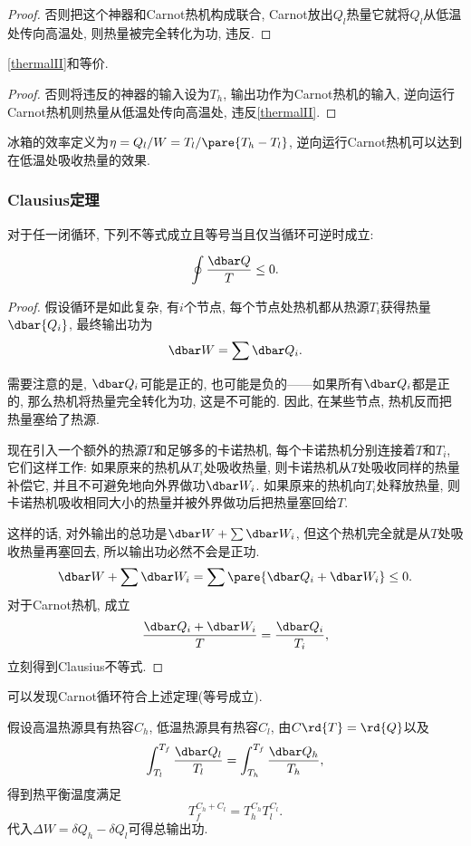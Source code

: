 \documentclass[../Thermal.tex]{subfiles}
\begin{document}
\begin{proof}
否则把这个神器和Carnot热机构成联合, Carnot放出$Q_l$热量它就将$Q_l$从低温处传向高温处, 则热量被完全转化为功, 违反.
\end{proof}
\begin{theorem}
\cref{thermalII}和等价.
\end{theorem}
\begin{proof}
否则将违反的神器的输入设为$T_h$, 输出功作为Carnot热机的输入, 逆向运行Carnot热机则热量从低温处传向高温处, 违反\cref{thermalII}.
\end{proof}
\begin{ex}[逆向运行的热机]
冰箱的效率定义为$\eta = Q_l/W = T_l/\pare{T_h - T_l}$, 逆向运行Carnot热机可以达到在低温处吸收热量的效果.
\end{ex}
\subsubsection{Clausius定理}
\begin{theorem}[Clausius定理]
对于任一闭循环, 下列不等式成立且等号当且仅当循环可逆时成立:
\begin{finale}
\[ \oint \frac{\dbar Q}{T} \le 0. \]
\end{finale}
\end{theorem}
\begin{proof}
假设循环是如此复杂, 有$i$个节点, 每个节点处热机都从热源$T_i$获得热量$\dbar{Q_i}$, 最终输出功为
\[ \dbar W = \sum \dbar Q_i. \]
\par
需要注意的是, $\dbar Q_i$可能是正的, 也可能是负的——如果所有$\dbar Q_i$都是正的, 那么热机将热量完全转化为功, 这是不可能的. 因此, 在某些节点, 热机反而把热量塞给了热源.
\par
现在引入一个额外的热源$T$和足够多的卡诺热机, 每个卡诺热机分别连接着$T$和$T_i$, 它们这样工作: 如果原来的热机从$T_i$处吸收热量, 则卡诺热机从$T$处吸收同样的热量补偿它, 并且不可避免地向外界做功$\dbar W_i$. 如果原来的热机向$T_i$处释放热量, 则卡诺热机吸收相同大小的热量并被外界做功后把热量塞回给$T$.
\par
这样的话, 对外输出的总功是$\dbar W + \sum \dbar W_i$, 但这个热机完全就是从$T$处吸收热量再塞回去, 所以输出功必然不会是正功.
\[ \dbar W + \sum \dbar W_i = \sum \pare{\dbar Q_i + \dbar W_i} \le 0. \]
对于Carnot热机, 成立
\[ \frac{\dbar Q_i + \dbar W_i}{T} = \frac{\dbar Q_i}{T_i}, \]
立刻得到Clausius不等式.
\end{proof}
\begin{ex}
可以发现Carnot循环符合上述定理(等号成立).
\end{ex}
\begin{ex}
假设高温热源具有热容$C_h$, 低温热源具有热容$C_l$, 由$C\rd{T} = \rd{Q}$以及
\[ \int_{T_l}^{T_f}\frac{\dbar Q_l}{T_l} = \int_{T_h}^{T_f}\frac{\dbar Q_h}{T_h}, \]
得到热平衡温度满足
\[ T_f^{C_h+C_l} = T_h^{C_h}T_l^{C_l}. \]
代入$\Delta W = \delta Q_h - \delta Q_l$可得总输出功.
\end{ex}
\end{document}
